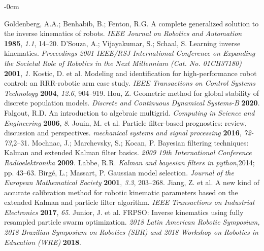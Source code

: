 \documentclass[journal,article,submit,pdftex,moreauthors]{Definitions/mdpi}
\begin{document}
\begin{adjustwidth}{-\extralength}{0cm}
\begin{thebibliography}{999}
Goldenberg, A.A.; Benhabib, B.; Fenton, R.G. A complete generalized solution to the inverse kinematics of robots. {\em IEEE Journal on Robotics and Automation} {\bf 1985}, {\em 1.1}, 14--20.
D'Souza, A.; Vijayakumar, S.; Schaal, S. Learning inverse kinematics. {\em Proceedings 2001 IEEE/RSJ International Conference on Expanding the Societal Role of Robotics in the Next Millennium (Cat. No. 01CH37180)} {\bf 2001}, {\em 1}.
Kostic, D. et al. Modeling and identification for high-performance robot control: an RRR-robotic arm case study. {\em IEEE Transactions on Control Systems Technology} {\bf 2004}, {\em 12.6}, 904--919.
Hou, Z. Geometric method for global stability of discrete population models. {\em Discrete and Continuous Dynamical Systems-B} {\bf 2020}.
Falgout, R.D. An introduction to algebraic multigrid. {\em Computing in Science and Engineering} {\bf 2006}, {\em 8}.
Jouin, M. et al. Particle filter-based prognostics: review, discussion and perspectives. {\em mechanical systems and signal processing} {\bf 2016}, {\em 72-73},2--31.
Mochnac, J.; Marchevsky, S.; Kocan, P. Bayesian filtering techniques: Kalman and extended Kalman filter basics. {\em 2009 19th International Conference Radioelektronika} {\bf 2009}.
Labbe, R.R.  \textit{Kalman and bayesian filters in python},2014; pp. 43--63.
Birgé, L.; Massart, P. Gaussian model selection. {\em Journal of the European Mathematical Society} {\bf 2001}, {\em 3.3}, 203--268.
Jiang, Z. et al. A new kind of accurate calibration method for robotic kinematic parameters based on the extended Kalman and particle filter algorithm. {\em IEEE Transactions on Industrial Electronics} {\bf 2017}, {\em 65}.
Junior, J. et al. FRPSO: Inverse kinematics using fully resampled particle swarm optimization. {\em 2018 Latin American Robotic Symposium, 2018 Brazilian Symposium on Robotics (SBR) and 2018 Workshop on Robotics in Education (WRE)} {\bf 2018}.











\end{thebibliography}
\end{adjustwidth}
\end{document}
